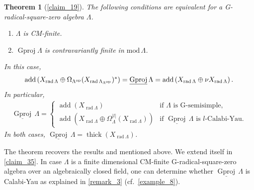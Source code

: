 \documentclass[12pt]{amsart}
\numberwithin{equation}{subsection}
\theoremstyle{plain}
\newtheorem{theorem}{Theorem}[section]
\theoremstyle{definition}
\newcommand{\rad}{\operatorname{rad}}
\newcommand{\add}{\operatorname{add}}
\renewcommand{\mod}{\mathrm{mod}\,}
\newcommand{\Gproj}{\operatorname{Gproj}}
\newcommand{\sGproj}{\underline{\operatorname{Gproj}}\,}
\newcommand{\thick}{\operatorname{thick}}
\renewcommand{\L}{\Lambda}
\newcommand{\op}{{\rm op}}
\begin{document}
\begin{theorem}[{\cref{claim_19}}]\label{theorem_B}
The following conditions are equivalent for a G-radical-square-zero algebra $\L$.
\begin{enumerate}
    \item $\L$ is CM-finite.
    \item $\Gproj\L$ is contravariantly finite in $\mod\L$.
\end{enumerate}
In this case, 
\begin{align}
    \textstyle 
    \add\left(X_{\rad\L}\oplus \Omega_{\L^\op}(X_{\rad\L_{\L^\op}})^*\right) 
    = \sGproj\L 
    = \add\left(X_{\rad\L} \oplus \nu X_{\rad\L}\right).
\end{align}
In particular, 
\begin{align}
    \textstyle 
    \sGproj\L  =     
    \begin{cases}
    \add\left(X_{\rad\L}\right) & \text{if $\L$ is G-semisimple,}\\[5pt]
    \add\left(X_{\rad\L}\oplus \Omega_\L^{|l|}(X_{\rad\L})\right) & \text{if $\sGproj\L $ is $l$-Calabi-Yau.}
    \end{cases}
\end{align}
In both cases, $\sGproj\L = \thick(X_{\rad\L})$.
\end{theorem} 
The theorem recovers the results \cite[Proposition 3.4]{Hafezi-Bahlekeh_2024} and \cite[Proposition 3.13(i)$\Rightarrow$(ii)]{Hafezi-Bahlekeh_2024} mentioned above.
We extend \cite[Proposition 3.13]{Hafezi-Bahlekeh_2024} itself in \cref{claim_35}.  
In case $\L$ is a finite dimensional CM-finite G-radical-square-zero algebra over an algebraically closed field, one can determine whether $\sGproj\L$ is Calabi-Yau as explained in \cref{remark_3} (cf.~\cref{example_8}).
\end{document}
